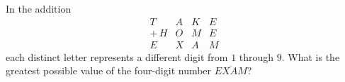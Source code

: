 In the addition
\[
\begin{array}{cccc} T&A&K&E\\ +\,H&O&M&E\\ \hline E&X&A&M\end{array}
\]
each distinct letter represents a different digit from $1$ through $9$. What is the greatest possible value of the four-digit number $\overline{EXAM}$?
